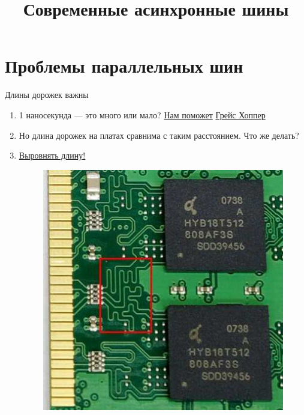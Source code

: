 \documentclass[xetex,aspectratio=43]{beamer}
\title[Современные асинхронные шины]{Современные асинхронные шины}
\begin{document}
\titleslide

\tocslide

\section{Проблемы параллельных шин}

\begin{frame}{Длины дорожек важны}
    \begin{enumerate}
        \item 1 наносекунда --- это много или мало? \href{https://youtu.be/gYqF6-h9Cvg}{Нам поможет} \href{https://en.wikipedia.org/wiki/Grace_Hopper}{Грейс Хоппер}
        \pause
        \item Но длина дорожек на платах сравнима с таким расстоянием. Что же делать?
        \pause
        \item \href{https://www.electromaker.io/blog/article/7-ways-to-quickly-judge-the-quality-of-your-printed-circuit-board-pcb-design}{Выровнять длину!}
        \begin{figure}
            \includegraphics[height=0.5\textheight]{img/03.length_equiv.jpg}
        \end{figure}
    \end{enumerate}
\end{frame}
\end{document}
